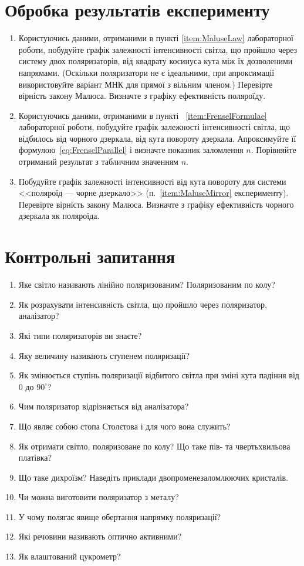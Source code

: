 \section{Обробка результатів експерименту}

\begin{enumerate}
\item Користуючись даними, отриманими в пункті \ref{item:MaluseLaw} лабораторної роботи, побудуйте графік залежності інтенсивності світла, що пройшло через систему двох поляризаторів, від квадрату косинуса кута між їх дозволеними напрямами. (Оскільки поляризатори не є ідеальними, при апроксимації використовуйте варіант МНК для прямої з вільним членом.) Перевірте вірність закону Малюса. Визначте з графіку ефективність поляроїду.
\item Користуючись даними, отриманими в пункті ~\ref{item:FrenselFormulae}  лабораторної роботи, побудуйте графік залежності інтенсивності світла, що відбилось від чорного дзеркала, від кута повороту дзеркала. Апроксимуйте її формулою~\eqref{eq:FrenselParallel} і визначте показник заломлення $n$. Порівняйте отриманий результат з табличним значенням $n$.
\item Побудуйте графік залежності інтенсивності від кута повороту для системи <<поляроїд --- чорне дзеркало>> (п.~\ref{item:MaluseMirror} експерименту). Перевірте вірність закону Малюса. Визначте з графіку ефективність чорного дзеркала як поляроїда.
\end{enumerate}

\section*{Контрольні запитання}
\begin{enumerate}[label*=\arabic*.]
\item Яке світло називають лінійно поляризованим? Поляризованим по колу?
\item Як розрахувати інтенсивність світла, що пройшло через поляризатор, аналізатор?
\item Які типи поляризаторів ви знаєте?
\item Яку величину називають ступенем поляризації?
\item Як змінюється ступінь поляризації відбитого світла при зміні кута падіння від $0$ до $90^\circ$?
\item Чим поляризатор відрізняється від аналізатора?
\item Що являє собою стопа Столєтова і для чого вона служить?
\item Як отримати світло, поляризоване по колу? Що таке пів- та чвертьхвильова платівка?
\item Що таке дихроїзм? Наведіть  приклади  двопроменезаломлюючих кристалів.
\item Чи можна виготовити поляризатор з металу?
\item У чому полягає явище обертання напрямку поляризації?
\item Які речовини називають оптично активними?
\item Як влаштований цукрометр?
\end{enumerate}

